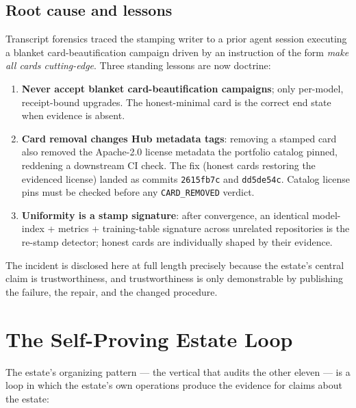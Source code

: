 ﻿\documentclass[11pt]{article}
\begin{document}
\subsection{Root cause and lessons}
Transcript forensics traced the stamping writer to a prior agent session executing a blanket card-beautification campaign driven by an instruction of the form \emph{make all cards cutting-edge}. Three standing lessons are now doctrine:
\begin{enumerate}
\item \textbf{Never accept blanket card-beautification campaigns}; only per-model, receipt-bound upgrades. The honest-minimal card is the correct end state when evidence is absent.
\item \textbf{Card removal changes Hub metadata tags}: removing a stamped card also removed the Apache-2.0 license metadata the portfolio catalog pinned, reddening a downstream CI check. The fix (honest cards restoring the evidenced license) landed as commits \texttt{2615fb7c} and \texttt{dd5de54c}. Catalog license pins must be checked before any \texttt{CARD\_REMOVED} verdict.
\item \textbf{Uniformity is a stamp signature}: after convergence, an identical model-index + metrics + training-table signature across unrelated repositories is the re-stamp detector; honest cards are individually shaped by their evidence.
\end{enumerate}
The incident is disclosed here at full length precisely because the estate's central claim is trustworthiness, and trustworthiness is only demonstrable by publishing the failure, the repair, and the changed procedure.

\section{The Self-Proving Estate Loop}
\label{sec:loop}

The estate's organizing pattern --- the vertical that audits the other eleven --- is a loop in which the estate's own operations produce the evidence for claims about the estate:
\end{document}
